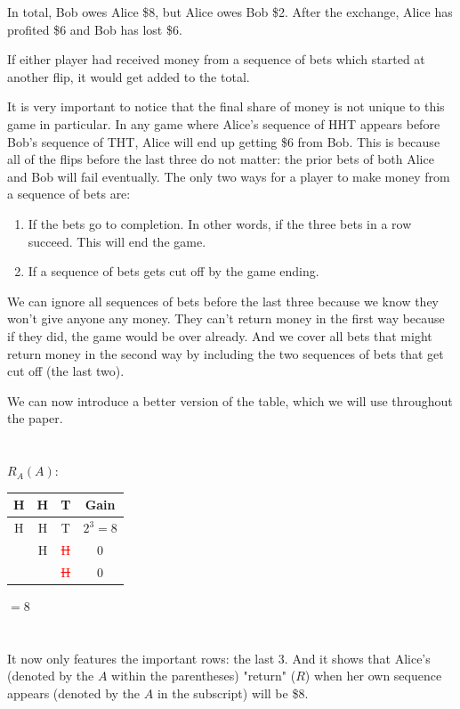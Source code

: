 \documentclass[english,12pt,a4paper,final]{article}
\begin{document}
In total, Bob owes Alice \$8, but Alice owes Bob \$2. After the exchange, Alice has profited \$6 and Bob has lost \$6.

If either player had received money from a sequence of bets which started at another flip, it would get added to the total.

It is very important to notice that the final share of money is not unique to this game in particular. In any game where Alice's sequence of HHT appears before Bob's sequence of THT, Alice will end up getting \$6 from Bob. This is because all of the flips before the last three do not matter: the prior bets of both Alice and Bob will fail eventually. The only two ways for a player to make money from a sequence of bets are:

\begin{enumerate}
	\item If the bets go to completion. In other words, if the three bets in a row succeed. This will end the game.
	\item If a sequence of bets gets cut off by the game ending.
\end{enumerate}

We can ignore all sequences of bets before the last three because we know they won't give anyone any money. They can't return money in the first way because if they did, the game would be over already. And we cover all bets that might return money in the second way by including the two sequences of bets that get cut off (the last two).

We can now introduce a better version of the table, which we will use throughout the paper.
\\\\\\
$R_A(A)$:
\begin{tabular}{|ccc|c|}
	\hline
	H & H & T & Gain \\
	\hline
	
	\textcolor{OliveGreen}{H} & \textcolor{OliveGreen}{H} & \textcolor{OliveGreen}{T} & $2^3=8$ \\
	
	& \textcolor{OliveGreen}{H} & \textcolor{red}{\sout{H}} & $0$ \\
	
	&  & \textcolor{red}{\sout{H}} & $0$ \\
	\hline
\end{tabular}
$=8$
\\\\\\
It now only features the important rows: the last 3. And it shows that Alice's (denoted by the $A$ within the parentheses) "return" ($R$) when her own sequence appears (denoted by the $A$ in the subscript) will be \$8.
\end{document}

